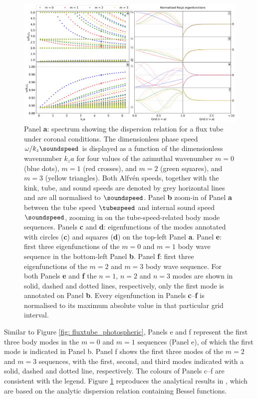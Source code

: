 \begin{figure}[t]
  \centering
  \includegraphics[width=\textwidth]{fluxtube_coronal.png}
  \caption{
    Panel \textbf{a}: spectrum showing the dispersion relation for a flux tube under coronal conditions. The dimensionless phase speed $\omega / k_z \soundspeed$ is displayed as a function of the dimensionless wavenumber $k_z a$ for four values of the azimuthal wavenumber $m = 0$ (blue dots), $m = 1$ (red crosses), and $m = 2$ (green squares), and $m = 3$ (yellow triangles). Both Alfv\'en speeds, together with the kink, tube, and sound speeds are denoted by grey horizontal lines and are all normalised to $\soundspeed$. Panel \textbf{b} zoom-in of Panel \textbf{a} between the tube speed $\tubespeed$ and internal sound speed $\soundspeed$, zooming in on the tube-speed-related body mode sequences. Panels \textbf{c} and \textbf{d}: eigenfunctions of the modes annotated with circles (\textbf{c}) and squares (\textbf{d}) on the top-left Panel \textbf{a}. Panel \textbf{e}: first three eigenfunctions of the $m = 0$ and $m = 1$ body wave sequence in the bottom-left Panel \textbf{b}. Panel \textbf{f}: first three eigenfunctions of the $m = 2$ and $m = 3$ body wave sequence. For both Panels \textbf{e} and \textbf{f} the $n = 1$, $n = 2$ and $n = 3$ modes are shown in solid, dashed and dotted lines, respectively, only the first mode is annotated on Panel \textbf{b}. Every eigenfunction in Panels \textbf{c}--\textbf{f} is normalised to its maximum absolute value in that particular grid interval.
  }
  \label{fig: fluxtube_coronal}
\end{figure}

Similar to Figure \ref{fig: fluxtube_photospheric}, Panels e and f represent the first three body modes in the $m = 0$ and $m = 1$ sequences (Panel e), of which the first mode is indicated in Panel b. Panel f shows the first three modes of the $m = 2$ and $m = 3$ sequences, with the first, second, and third modes indicated with a solid, dashed and dotted line, respectively. The colours of Panels c--f are consistent with the legend. Figure \ref{fig: fluxtube_coronal} reproduces the analytical results in \citet[Figure 6.7]{book_roberts}, which are based on the analytic dispersion relation containing Bessel functions.


